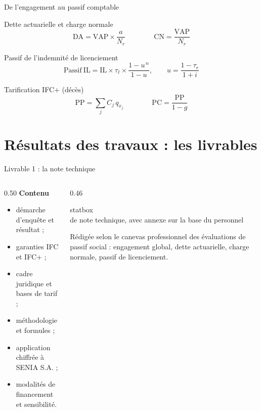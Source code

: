 \documentclass[aspectratio=169,11pt]{beamer}
\newcommand{\stat}[2]{%
  \begin{beamercolorbox}[wd=\linewidth,ht=1.5cm,dp=0.8cm,center,rounded=true]{statbox}%
    \centering{\LARGE\bfseries\textcolor{orangeC}{#1}}\\[0.15cm]
    {\small\textcolor{encre}{#2}}%
  \end{beamercolorbox}}
\begin{document}
\begin{frame}{De l'engagement au passif comptable}
  \vspace{0.2cm}
  \begin{block}{Dette actuarielle et charge normale}
    \vspace{-0.25cm}
    $$ \mathrm{DA} = \mathrm{VAP}\times\frac{a}{N_r}
       \qquad\qquad \mathrm{CN} = \frac{\mathrm{VAP}}{N_r} $$
  \end{block}
  \begin{block}{Passif de l'indemnité de licenciement}
    \vspace{-0.25cm}
    $$ \mathrm{Passif\ IL} = \mathrm{IL}\times\tau_\ell\times\frac{1-u^{\,n}}{1-u},
       \qquad u=\frac{1-\tau_r}{1+i} $$
  \end{block}
  \begin{block}{Tarification IFC+ (décès)}
    \vspace{-0.25cm}
    $$ \mathrm{PP} = \sum_j C_j\,q_{x_j}
       \qquad\qquad \mathrm{PC} = \frac{\mathrm{PP}}{1-g} $$
  \end{block}
\end{frame}

\section{Résultats des travaux : les livrables}

\begin{frame}{Livrable 1 : la note technique}
  \vspace{0.2cm}
  \begin{columns}[T]
    \begin{column}{0.50\textwidth}
      \textcolor{orangeC}{\textbf{Contenu}}
      \begin{itemize}\itemsep0.15cm
        \item démarche d'enquête et résultat ;
        \item garanties IFC et IFC+ ;
        \item cadre juridique et bases de tarif ;
        \item méthodologie et formules ;
        \item application chiffrée à SENIA S.A. ;
        \item modalités de financement et sensibilité.
      \end{itemize}
    \end{column}
    \begin{column}{0.46\textwidth}
      \stat{10 pages}{de note technique, avec annexe sur la base du personnel}
      \vspace{0.25cm}
      {\small Rédigée selon le canevas professionnel des évaluations de passif
      social : engagement global, dette actuarielle, charge normale, passif de
      licenciement.}
    \end{column}
  \end{columns}
\end{frame}
\end{document}
